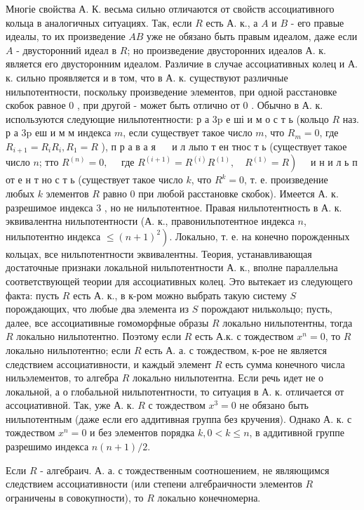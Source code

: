 \documentclass[10pt]{article}
\begin{document}
Многіе свойства А. К. весьма сильно отличаются от свойств ассоциативного кольца в аналогичных ситуациях. Так, если $R$ есть А. к., а $A$ и $B$ - его правые идеалы, то их произведение $A B$ уже не обязано быть правым идеалом, даже если $A$ - двусторонний идеал в $R$; но произведение двусторонних идеалов А. к. является его двусторонним идеалом. Различие в случае ассоциативных колец и А. к. сильно проявляется и в том, что в А. к. существуют различные нильпотентности, поскольку произведение элементов, при одной расстановке скобок равное 0 , при другой - может быть отлично от 0 . Обычно в А. к. используются следующие нильпотентности: р а $3 \mathrm{p}$ е ші и м о с т ь (кольцо $R$ наз. р а $3 \mathrm{p}$ еш и м м индекса $m$, если существует такое число $m$, что $R_{m}=0$, где $R_{i+1}=R_{i} R_{i}, R_{1}=R$ ), п р а в а я $\quad$ и л льпо т ен тнос т ь (существует такое число $n$; тто $R^{(n)}=0, \quad$ где $\left.R^{(i+1)}=R^{(i)} R^{(1)}, \quad R^{(1)}=R\right) \quad$ и н и л ь п от е н т но с т ь (существует такое число $k$, что $R^{k}=0$, т. е. произведение любых $k$ элементов $R$ равно 0 при любой расстановке скобок). Имеется А. к. разрешимое индекса 3 , но не нильпотентное. Правая нильпотентность в А. к. эквивалентна нильпотентности (А. к., правонильпотентное индекса $n$, нильпотентно индекса $\left.\leqslant(n+1)^{2}\right)$. Локально, т. е. на конечно порожденных кольцах, все нильпотентности эквивалентны. Теория, устанавливающая достаточные признаки локальной нильпотентности А. к., вполне параллельна соответствующей теории для ассоциативных колец. Это вытекает из следующего факта: пусть $R$ есть А. к., в к-ром можно выбрать такую систему $S$ порождающих, что любые два элемента из $S$ порождают нилькольцо; пусть, далее, все ассоциативные гомоморфные образы $R$ локально нильпотентны, тогда $R$ локально нильпотентно. Поэтому если $R$ есть А.к. с тождеством $x^{n}=0$, то $R$ локально нильпотентно; если $R$ есть А. а. с тождеством, к-рое не является следствием ассоциативности, и каждый элемент $R$ есть сумма конечного числа нильэлементов, то алгебра $R$ локально нильпотентна. Если речь идет не о локальной, а о глобальной нильпотентности, то ситуация в А. к. отличается от ассоциативной. Так, уже А. к. $R$ с тождеством $x^{3}=0$ не обязано быть нильпотентным (даже если его аддитивная группа без кручения). Однако А. к. с тождеством $x^{n}=0$ и без элементов порядка $k, 0<k \leqslant n$, в аддитивной группе разрешимо индекса $n(n+1) / 2$.



Если $R$ - алгебраич. А. а. с тождественным соотношением, не являющимся следствием ассоциативности (или степени алгебраичности элементов $R$ ограничены в совокупности), то $R$ локально конечномерна.
\end{document}

